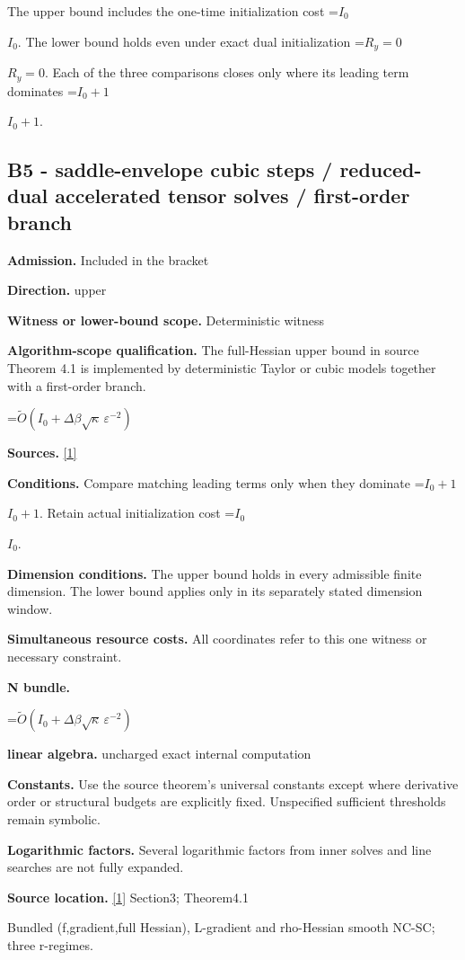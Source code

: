 \documentclass[10pt,a4paper]{article}
\newcommand{\AtlasMath}[1]{\par\begingroup\centering\setbox0=\hbox{$\displaystyle #1$}\ifdim\wd0>1.4\linewidth\typeout{ATLAS WIDE FORMULA: \the\wd0}\fi\ifdim\wd0>\linewidth\resizebox{\linewidth}{!}{\box0}\else\box0\fi\par\endgroup}
\newcommand{\AtlasInlineMath}[1]{\begingroup\setbox0=\hbox{$#1$}\ifdim\wd0>.4\linewidth\endgroup\AtlasMath{#1}\else\endgroup$#1$\fi}
\begin{document}
The upper bound includes the one-time initialization cost \AtlasInlineMath{I_0}. The lower bound holds even under exact dual initialization \AtlasInlineMath{R_y=0}. Each of the three comparisons closes only where its leading term dominates \AtlasInlineMath{I_0+1}.

\subsection{B5 - saddle-envelope cubic steps / reduced-dual accelerated tensor solves / first-order branch}
\textbf{Admission.} Included in the bracket

\textbf{Direction.} upper

\textbf{Witness or lower-bound scope.} Deterministic witness

\textbf{Algorithm-scope qualification.} The full-Hessian upper bound in source Theorem 4.1 is implemented by deterministic Taylor or cubic models together with a first-order branch.

\AtlasMath{\widetilde{O}(I_0+\Delta\beta\sqrt\kappa\,\varepsilon^{-2})}
\textbf{Sources.} \href{https://arxiv.org/pdf/2610.16771v2}{[1]}

\textbf{Conditions.} Compare matching leading terms only when they dominate \AtlasInlineMath{I_0+1}. Retain actual initialization cost \AtlasInlineMath{I_0}.

\textbf{Dimension conditions.} The upper bound holds in every admissible finite dimension. The lower bound applies only in its separately stated dimension window.

\textbf{Simultaneous resource costs.} All coordinates refer to this one witness or necessary constraint.

\textbf{N bundle.}

\AtlasMath{\widetilde O(I_0+\Delta\beta\sqrt\kappa\,\varepsilon^{-2})}
\textbf{linear algebra.} uncharged exact internal computation

\textbf{Constants.} Use the source theorem’s universal constants except where derivative order or structural budgets are explicitly fixed. Unspecified sufficient thresholds remain symbolic.

\textbf{Logarithmic factors.} Several logarithmic factors from inner solves and line searches are not fully expanded.

\textbf{Source location.} \href{https://arxiv.org/pdf/2610.16771v2}{[1]} Section3; Theorem4.1

Bundled (f,gradient,full Hessian), L-gradient and rho-Hessian smooth NC-SC; three r-regimes.
\end{document}
